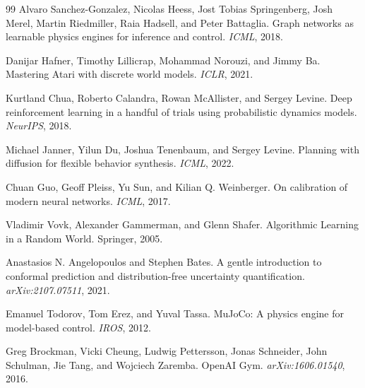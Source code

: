 \documentclass[10pt]{article}
\begin{document}
\begin{thebibliography}{99}
Alvaro Sanchez-Gonzalez, Nicolas Heess, Jost Tobias Springenberg, Josh Merel, Martin Riedmiller, Raia Hadsell, and Peter Battaglia.
\newblock Graph networks as learnable physics engines for inference and control.
\newblock \emph{ICML}, 2018.

Danijar Hafner, Timothy Lillicrap, Mohammad Norouzi, and Jimmy Ba.
\newblock Mastering Atari with discrete world models.
\newblock \emph{ICLR}, 2021.

Kurtland Chua, Roberto Calandra, Rowan McAllister, and Sergey Levine.
\newblock Deep reinforcement learning in a handful of trials using probabilistic dynamics models.
\newblock \emph{NeurIPS}, 2018.

Michael Janner, Yilun Du, Joshua Tenenbaum, and Sergey Levine.
\newblock Planning with diffusion for flexible behavior synthesis.
\newblock \emph{ICML}, 2022.

Chuan Guo, Geoff Pleiss, Yu Sun, and Kilian Q. Weinberger.
\newblock On calibration of modern neural networks.
\newblock \emph{ICML}, 2017.

Vladimir Vovk, Alexander Gammerman, and Glenn Shafer.
\newblock Algorithmic Learning in a Random World.
\newblock Springer, 2005.

Anastasios N. Angelopoulos and Stephen Bates.
\newblock A gentle introduction to conformal prediction and distribution-free uncertainty quantification.
\newblock \emph{arXiv:2107.07511}, 2021.

Emanuel Todorov, Tom Erez, and Yuval Tassa.
\newblock MuJoCo: A physics engine for model-based control.
\newblock \emph{IROS}, 2012.

Greg Brockman, Vicki Cheung, Ludwig Pettersson, Jonas Schneider, John Schulman, Jie Tang, and Wojciech Zaremba.
\newblock OpenAI Gym.
\newblock \emph{arXiv:1606.01540}, 2016.

\end{thebibliography}
\end{document}
